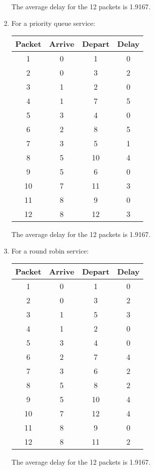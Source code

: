 \documentclass{article}
\begin{document}
\begin{enumerate}
\begin{enumerate}
The average delay for the 12 packets is 1.9167.

\item For a priority queue service:

\begin{tabular}{|c|c|c|c|}
    \hline
    Packet & Arrive & Depart & Delay \\
    \hline
    1 & 0 & 1 & 0 \\ \hline
    2 & 0 & 3 & 2 \\ \hline
    3 & 1 & 2 & 0 \\ \hline
    4 & 1 & 7 & 5 \\ \hline
    5 & 3 & 4 & 0 \\ \hline
    6 & 2 & 8 & 5 \\ \hline
    7 & 3 & 5 & 1 \\ \hline
    8 & 5 & 10 & 4 \\ \hline
    9 & 5 & 6 & 0 \\ \hline
    10 & 7 & 11 & 3 \\ \hline
    11 & 8 & 9 & 0 \\ \hline
    12 & 8 & 12 & 3 \\ \hline
\end{tabular}

The average delay for the 12 packets is 1.9167.

\item For a round robin service:

\begin{tabular}{|c|c|c|c|}
    \hline
    Packet & Arrive & Depart & Delay \\
    \hline
    1 & 0 & 1 & 0 \\ \hline
    2 & 0 & 3 & 2 \\ \hline
    3 & 1 & 5 & 3 \\ \hline
    4 & 1 & 2 & 0 \\ \hline
    5 & 3 & 4 & 0 \\ \hline
    6 & 2 & 7 & 4 \\ \hline
    7 & 3 & 6 & 2 \\ \hline
    8 & 5 & 8 & 2 \\ \hline
    9 & 5 & 10 & 4 \\ \hline
    10 & 7 & 12 & 4 \\ \hline
    11 & 8 & 9 & 0 \\ \hline
    12 & 8 & 11 & 2 \\ \hline
\end{tabular}

The average delay for the 12 packets is 1.9167.


\end{enumerate}
\end{enumerate}
\end{document}

